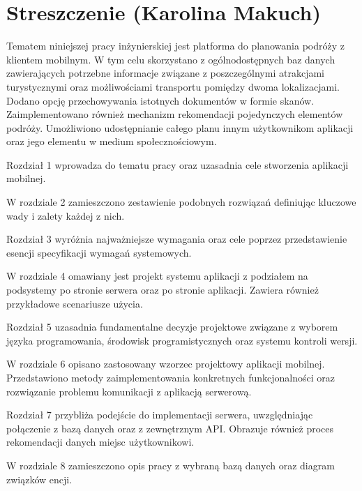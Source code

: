 \chapter*{Streszczenie (Karolina Makuch)}
 \par Tematem niniejszej pracy inżynierskiej jest platforma do planowania podróży z klientem mobilnym. W tym celu skorzystano z ogólnodostępnych baz danych zawierających potrzebne informacje związane z poszczególnymi atrakcjami turystycznymi oraz możliwościami transportu pomiędzy dwoma lokalizacjami. Dodano opcję przechowywania istotnych dokumentów w formie skanów. Zaimplementowano również mechanizm rekomendacji pojedynczych elementów podróży. Umożliwiono udostępnianie całego planu innym użytkownikom aplikacji oraz jego elementu w medium społecznościowym.
 
 \par Rozdział 1 wprowadza do tematu pracy  oraz uzasadnia cele stworzenia aplikacji mobilnej. 
 
 \par W rozdziale 2 zamieszczono zestawienie podobnych rozwiązań definiując kluczowe wady i zalety każdej z nich.

\par Rozdział 3 wyróżnia najważniejsze wymagania oraz cele poprzez przedstawienie esencji specyfikacji wymagań systemowych.

\par W rozdziale 4 omawiany jest projekt systemu aplikacji z podziałem na podsystemy po stronie serwera oraz po stronie aplikacji. Zawiera również przykładowe scenariusze użycia.

\par Rozdział 5 uzasadnia fundamentalne decyzje projektowe związane z wyborem języka programowania, środowisk programistycznych oraz systemu kontroli wersji.

\par W rozdziale 6 opisano zastosowany wzorzec projektowy aplikacji mobilnej. Przedstawiono metody zaimplementowania konkretnych funkcjonalności oraz rozwiązanie problemu komunikacji z aplikacją serwerową. 

\par Rozdział 7 przybliża podejście do implementacji serwera, uwzględniając połączenie z bazą danych oraz z zewnętrznym API. Obrazuje również proces rekomendacji danych miejsc użytkownikowi.

\par W rozdziale 8 zamieszczono opis pracy z wybraną bazą danych oraz diagram związków encji.

